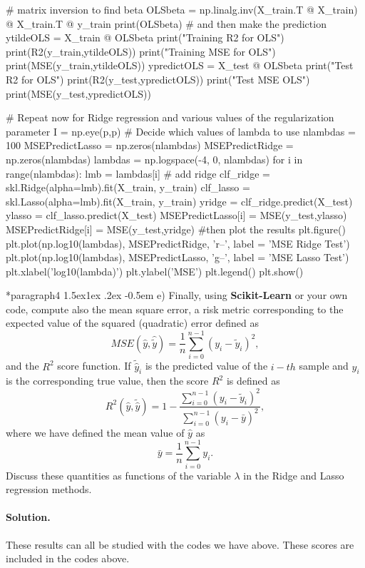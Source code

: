 \documentclass[%
oneside,                 %
final,                   %
10pt]{article}
\makeatletter
\newenvironment{doconceexercise}{}{}
\newcommand\subex{\@startsection*{paragraph}{4}{\z@}%
                  {1.5ex\@plus1ex \@minus.2ex}%
                  {-0.5em}%
                  {\normalfont\normalsize\bfseries}}
\makeatother
\begin{document}
\begin{doconceexercise}
\begin{print}
# matrix inversion to find beta
OLSbeta = np.linalg.inv(X_train.T @ X_train) @ X_train.T @ y_train
print(OLSbeta)
# and then make the prediction
ytildeOLS = X_train @ OLSbeta
print("Training R2 for OLS")
print(R2(y_train,ytildeOLS))
print("Training MSE for OLS")
print(MSE(y_train,ytildeOLS))
ypredictOLS = X_test @ OLSbeta
print("Test R2 for OLS")
print(R2(y_test,ypredictOLS))
print("Test MSE OLS")
print(MSE(y_test,ypredictOLS))

# Repeat now for Ridge regression and various values of the regularization parameter
I = np.eye(p,p)
# Decide which values of lambda to use
nlambdas = 100
MSEPredictLasso = np.zeros(nlambdas)
MSEPredictRidge = np.zeros(nlambdas)
lambdas = np.logspace(-4, 0, nlambdas)
for i in range(nlambdas):
    lmb = lambdas[i]
    # add ridge
    clf_ridge = skl.Ridge(alpha=lmb).fit(X_train, y_train)
    clf_lasso = skl.Lasso(alpha=lmb).fit(X_train, y_train)
    yridge = clf_ridge.predict(X_test)
    ylasso = clf_lasso.predict(X_test)
    MSEPredictLasso[i] = MSE(y_test,ylasso)
    MSEPredictRidge[i] = MSE(y_test,yridge)
#then plot the results
plt.figure()
plt.plot(np.log10(lambdas), MSEPredictRidge, 'r--', label = 'MSE Ridge Test')
plt.plot(np.log10(lambdas), MSEPredictLasso, 'g--', label = 'MSE Lasso Test')
plt.xlabel('log10(lambda)')
plt.ylabel('MSE')
plt.legend()
plt.show()
\end{print}


\subex{e)}
Finally, using \textbf{Scikit-Learn} or your own code, compute also the mean square error, a risk metric corresponding to the expected value of the squared (quadratic) error defined as
\[ MSE(\hat{y},\hat{\tilde{y}}) = \frac{1}{n}
\sum_{i=0}^{n-1}(y_i-\tilde{y}_i)^2, 
\] 
and the $R^2$ score function.
If $\tilde{\hat{y}}_i$ is the predicted value of the $i-th$ sample and $y_i$ is the corresponding true value, then the score $R^2$ is defined as
\[
R^2(\hat{y}, \tilde{\hat{y}}) = 1 - \frac{\sum_{i=0}^{n - 1} (y_i - \tilde{y}_i)^2}{\sum_{i=0}^{n - 1} (y_i - \bar{y})^2},
\]
where we have defined the mean value  of $\hat{y}$ as
\[
\bar{y} =  \frac{1}{n} \sum_{i=0}^{n - 1} y_i.
\]
Discuss these quantities as functions of the variable $\lambda$ in the Ridge and Lasso regression methods.


\paragraph{Solution.}
These results can all be studied with the codes we have above. These scores are included in the codes above.



\end{doconceexercise}
\end{document}

